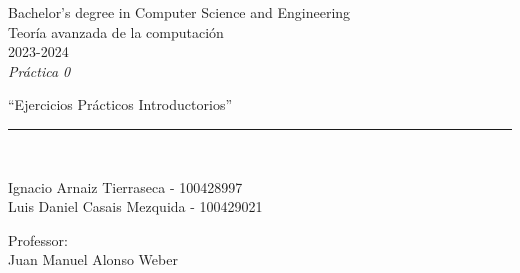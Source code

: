 \def\degree{Bachelor's degree in Computer Science and Engineering}
\def\subject{Teoría avanzada de la computación}
\def\year{2023-2024}
\def\labType{Práctica 0}
\def\labName{Ejercicios Prácticos Introductorios}
\def\proffesor{Juan Manuel Alonso Weber}

\begin{titlepage}
	\begin{sffamily}
	\color{azulUC3M}
	\begin{center}

		\begin{figure}[H]
		\end{figure}
		\vspace{1.5cm}

		\begin{Large}
			\degree\\
            \subject\\
			\year\\
			\vspace{2cm}		
			\textsl{\labType}
			\bigskip
			
		\end{Large}

		{\Huge ``\labName''}\\

		\vspace*{0.5cm}
		\rule{10.5cm}{0.1mm}\\
		\vspace*{0.9cm}
		
 		{\LARGE Ignacio Arnaiz Tierraseca - 100428997}\\
 		\vspace*{0.2cm}
 		{\LARGE Luis Daniel Casais Mezquida - 100429021}\\
 		\vspace*{0.2cm}
		
		\vspace*{0.8cm}
		
		\begin{Large}
		    Professor:\\
			\proffesor\\
		\end{Large}

	\end{center}
	\vfill
	\end{sffamily}
\end{titlepage}
